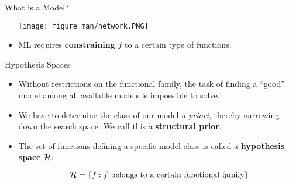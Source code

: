 \documentclass[11pt,compress,t,notes=noshow, xcolor=table]{beamer}
\begin{document}
\begin{vbframe}{What is a Model?}
\begin{itemize}
    \vspace{-5ex}
    {
    \texttt{[image: figure\_man/network.PNG]}
    }
    \vspace{-5ex}
    
    \item ML requires \textbf{constraining} $f$ to a   certain type of functions.
    
  \end{itemize}
  
\end{vbframe}


\begin{vbframe}{Hypothesis Spaces}
  
  \begin{itemize}
    
    \item Without restrictions on the functional family, the task of finding a 
    \enquote{good} model among all available models is impossible to solve.
    
    \item We have to determine the class of our model \emph{a priori}, 
    thereby narrowing down the search space. We  call this a 
    \textbf{structural prior}.
    
    \item The set of functions defining a specific model class is called a 
    \textbf{hypothesis space} $\mathcal{H}$:
    
    $$\mathcal{H} = \{f: f \text{ belongs to a certain functional family}\}$$
    
    
  \end{itemize}  
  
\end{vbframe}

\end{document}

